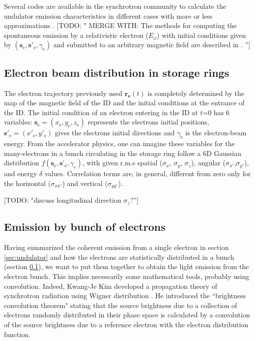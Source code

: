 \documentclass{iucr}              %
\newcommand{\todo}[1]{{\color{red}[TODO: "#1'']}}
\begin{document}
Several codes are available in the synchrotron community to calculate the undulator emission characteristics in different cases with more \cite{codeURGENT,codeUS} or less approximations \cite{codeSPECTRA, codeSRW}. \todo{ MERGE WITH: The methods for computing the spontaneous emission by a relativistic electron ($E_\omega$) with initial conditions given by $(\textbf{s}_\text{e}, \textbf{s}'_\text{e},\gamma_\text{e})$ and submitted to an arbitrary magnetic field are described in \cite{Chubar1995,codeSRW}. }

\subsection{Electron beam distribution in storage rings}
\label{sec:electronbeam}

The electron trajectory previously used $\textbf{r}_{\textbf{e}}(t)$ is completely determined by the map of the magnetic field of the ID and the initial conditions at the entrance of the ID. 
The initial condition of an electron entering in the ID at $t$=0 has 6 variables:
$\textbf{s}_\text{e}=(x_\text{e},y_\text{e},z_\text{e})$ represents the electrons initial positions, $\textbf{s}'_\text{e}=(x'_\text{e},y'_\text{e})$ gives the electrons initial directions and $\gamma_\text{e}$ is the electron-beam energy.
From the accelerator physics, one can imagine these variables for the many-electrons in a bunch circulating in the storage ring follow a 6D Gaussian distribution $f(\textbf{s}_\text{e}, \textbf{s'}_\text{e}, \gamma_e)$, with given r.m.s spatial ($\sigma_x$, $\sigma_y$, $\sigma_z$), angular ($\sigma_{x'}$,$\sigma_{y'}$), and energy $\delta$ values. Correlation terms are, in general, different from zero only for the horizontal ($\sigma_{x x'}$) and vertical ($\sigma_{y y'}$). 
 
\todo{discuss longitudinal direction $\sigma_z$?}

\subsection{Emission by bunch of electrons }

Having summarized the coherent emission from a single electron in section \ref{sec:undulator} and how the electrons are statistically distributed in a bunch (section \ref{sec:electronbeam}), we want to put them together to obtain the light emission from the electron bunch. This implies necessarily some mathematical tools, probably using convolution. Indeed, Kwang-Je Kim developed a propagation theory of synchrotron radiation using Wigner distribution \cite{KimConvolution}. He introduced the ``brightness convolution theorem" stating that the source brightness due to a collection of electrons randomly distributed in their phase space is calculated by a convolution of the source brightness due to a reference electron with the electron distribution function. 
\end{document}
